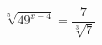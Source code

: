 \begin{ex}[type=equation]
	\begin{condition}
		$\sqrt[5]{49^{x - 4}} = \dfrac{7}{\sqrt[3]{7}}$
	\end{condition}
\end{ex}